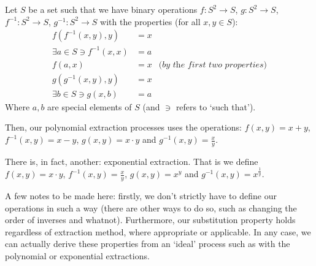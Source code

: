 Let $S$ be a set such that we have binary operations $f:S^2\to S$, $g:S^2\to S$, $f^{-1}:S^2\to S$, $g^{-1}:S^2\to S$ with the properties (for all $x,y\in S$):
\begin{align*}
    f(f^{-1}(x,y),y) &= x \\
    \exists a\in S\ni f^{-1}(x,x) &= a \\
    f(a,x) &= x & \textit{(by the first two properties)} \\
    g(g^{-1}(x,y),y) &= x \\
    \exists b\in S\ni g(x,b) &= a
\end{align*}
Where $a,b$ are special elements of $S$ (and $\ni$ refers to `such that').

Then, our polynomial extraction processes uses the operations: $f(x,y)=x+y$, $f^{-1}(x,y)=x-y$, $g(x,y)=x\cdot y$ and $g^{-1}(x,y)=\frac{x}{y}$.

There is, in fact, another: exponential extraction. That is we define $f(x,y)=x\cdot y$, $f^{-1}(x,y)=\frac{x}{y}$, $g(x,y)=x^y$ and $g^{-1}(x,y)=x^\frac{1}{y}$.

A few notes to be made here: firstly, we don't strictly have to define our operations in such a way (there are other ways to do so, such as changing the order of inverses and whatnot). Furthermore, our substitution property holds regardless of extraction method, where appropriate or applicable. In any case, we can actually derive these properties from an `ideal' process such as with the polynomial or exponential extractions.

